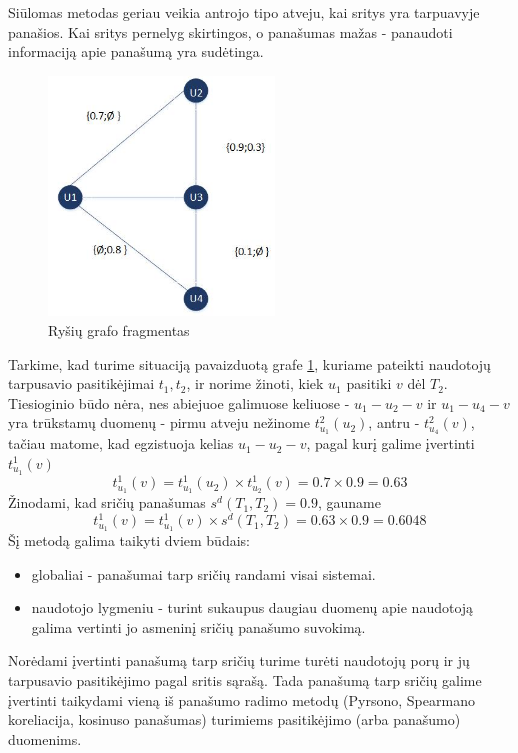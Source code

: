 \documentclass{VUMIFInfMagistrinis}
\begin{document}
Siūlomas metodas geriau veikia antrojo tipo atveju, kai sritys yra tarpuavyje panašios. Kai sritys pernelyg skirtingos, o panašumas mažas - panaudoti informaciją apie panašumą yra sudėtinga.
\begin{figure}[ht!]
	\centering
	\includegraphics[width=60mm]{multiarea.jpg}
	\caption{Ryšių grafo fragmentas} \label{multiarea}
\end{figure}
Tarkime, kad turime situaciją pavaizduotą grafe \ref{multiarea}, kuriame pateikti naudotojų tarpusavio pasitikėjimai ${t_1, t_2}$, ir norime žinoti, kiek $u_1$ pasitiki $v$ dėl $T_2$. Tiesioginio būdo nėra, nes abiejuoe galimuose keliuose - $u_1 - u_2 - v$ ir $u_1 - u_4 - v$ yra trūkstamų duomenų - pirmu atveju nežinome $t_{u_1}^2(u_2)$, antru - $t_{u_4}^2(v)$, tačiau matome, kad egzistuoja kelias $u_1 - u_2 - v$, pagal kurį galime įvertinti $t_{u_1}^1(v)$
\begin{displaymath}
t_{u_1}^1(v)=t_{u_1}^1(u_2) \times t_{u_2}^1(v) = 0.7 \times 0.9 = 0.63
\end{displaymath}
Žinodami, kad sričių panašumas $s^d(T_1, T_2) = 0.9$, gauname
\begin{displaymath}
t_{u_1}^1(v)=t_{u_1}^1(v) \times s^d(T_1, T_2) = 0.63 \times 0.9 = 0.6048
\end{displaymath}
\indent
Šį metodą galima taikyti dviem būdais:
\begin{itemize}
	\item globaliai - panašumai tarp sričių randami visai sistemai.
	\item naudotojo lygmeniu - turint sukaupus daugiau duomenų apie naudotoją galima vertinti jo asmeninį sričių panašumo suvokimą.
\end{itemize}
\indent Norėdami įvertinti panašumą tarp sričių turime turėti naudotojų porų ir jų tarpusavio pasitikėjimo pagal sritis sąrašą. Tada panašumą tarp sričių galime įvertinti taikydami vieną iš panašumo radimo metodų (Pyrsono, Spearmano koreliacija, kosinuso panašumas) turimiems pasitikėjimo (arba panašumo) duomenims. 
\end{document}

